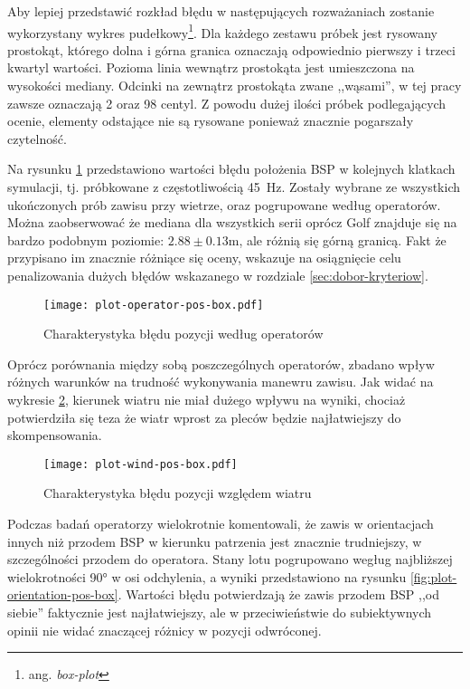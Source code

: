 Aby lepiej przedstawić rozkład błędu w następujących rozważaniach zostanie wykorzystany wykres pudełkowy\footnote{ang. \emph{box-plot}}. Dla każdego zestawu próbek jest rysowany prostokąt, którego dolna i górna granica oznaczają odpowiednio pierwszy i trzeci kwartyl wartości. Pozioma linia wewnątrz prostokąta jest umieszczona na wysokości mediany. Odcinki na zewnątrz prostokąta zwane ,,wąsami'', w tej pracy zawsze oznaczają 2 oraz 98 centyl. Z powodu dużej ilości próbek podlegających ocenie, elementy odstające nie są rysowane ponieważ znacznie pogarszały czytelność.

Na rysunku \ref{fig:plot-operator-pos-box} przedstawiono wartości błędu położenia BSP w kolejnych klatkach symulacji, tj. próbkowane z częstotliwością 45~Hz. Zostały wybrane ze wszystkich ukończonych prób zawisu przy wietrze, oraz pogrupowane według operatorów. Można zaobserwować że mediana dla wszystkich serii oprócz Golf znajduje się na bardzo podobnym poziomie: $ 2.88 \pm 0.13 \text{m} $, ale różnią się górną granicą. Fakt że przypisano im znacznie różniące się oceny, wskazuje na osiągnięcie celu penalizowania dużych błędów wskazanego w rozdziale \ref{sec:dobor-kryteriow}.

\begin{figure}[!h]
    \centering \texttt{[image: plot-operator-pos-box.pdf]}
    \caption{Charakterystyka błędu pozycji według operatorów}
    \label{fig:plot-operator-pos-box}
\end{figure}

Oprócz porównania między sobą poszczególnych operatorów, zbadano wpływ różnych warunków na trudność wykonywania manewru zawisu. Jak widać na wykresie \ref{fig:plot-wind-pos-box}, kierunek wiatru nie miał dużego wpływu na wyniki, chociaż potwierdziła się teza że wiatr wprost za pleców będzie najłatwiejszy do skompensowania.

\begin{figure}[!h]
    \centering \texttt{[image: plot-wind-pos-box.pdf]}
    \caption{Charakterystyka błędu pozycji względem wiatru}
    \label{fig:plot-wind-pos-box}
\end{figure}

Podczas badań operatorzy wielokrotnie komentowali, że zawis w orientacjach innych niż przodem BSP w kierunku patrzenia jest znacznie trudniejszy, w szczególności przodem do operatora. Stany lotu pogrupowano wegług najbliższej wielokrotności 90° w osi odchylenia, a wyniki przedstawiono na rysunku \ref{fig:plot-orientation-pos-box}. Wartości błędu potwierdzają że zawis przodem BSP ,,od siebie'' faktycznie jest najłatwiejszy, ale w przeciwieństwie do subiektywnych opinii nie widać znaczącej różnicy w pozycji odwróconej.

